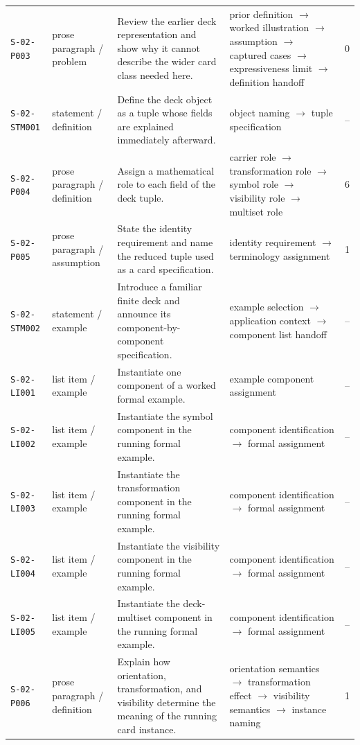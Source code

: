 \documentclass[10pt]{article}
\begin{document}
\begin{longtable}{@{}p{}p{}p{}p{}p{}@{}}
\texttt{S-02-P003}&prose paragraph / problem&Review the earlier deck representation and show why it cannot describe the wider card class needed here.&prior definition $\rightarrow$ worked illustration $\rightarrow$ assumption $\rightarrow$ captured cases $\rightarrow$ expressiveness limit $\rightarrow$ definition handoff&0\\
\texttt{S-02-STM001}&statement / definition&Define the deck object as a tuple whose fields are explained immediately afterward.&object naming $\rightarrow$ tuple specification&--\\
\texttt{S-02-P004}&prose paragraph / definition&Assign a mathematical role to each field of the deck tuple.&carrier role $\rightarrow$ transformation role $\rightarrow$ symbol role $\rightarrow$ visibility role $\rightarrow$ multiset role&6\\
\texttt{S-02-P005}&prose paragraph / assumption&State the identity requirement and name the reduced tuple used as a card specification.&identity requirement $\rightarrow$ terminology assignment&1\\
\texttt{S-02-STM002}&statement / example&Introduce a familiar finite deck and announce its component-by-component specification.&example selection $\rightarrow$ application context $\rightarrow$ component list handoff&--\\
\texttt{S-02-LI001}&list item / example&Instantiate one component of a worked formal example.&example component assignment&--\\
\texttt{S-02-LI002}&list item / example&Instantiate the symbol component in the running formal example.&component identification $\rightarrow$ formal assignment&--\\
\texttt{S-02-LI003}&list item / example&Instantiate the transformation component in the running formal example.&component identification $\rightarrow$ formal assignment&--\\
\texttt{S-02-LI004}&list item / example&Instantiate the visibility component in the running formal example.&component identification $\rightarrow$ formal assignment&--\\
\texttt{S-02-LI005}&list item / example&Instantiate the deck-multiset component in the running formal example.&component identification $\rightarrow$ formal assignment&--\\
\texttt{S-02-P006}&prose paragraph / definition&Explain how orientation, transformation, and visibility determine the meaning of the running card instance.&orientation semantics $\rightarrow$ transformation effect $\rightarrow$ visibility semantics $\rightarrow$ instance naming&1\\

\end{longtable}
\end{document}
